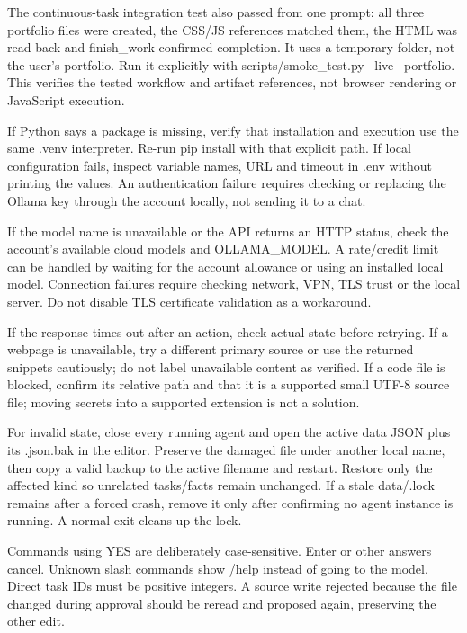 The continuous-task integration test also passed from one prompt: all three portfolio files were created, the CSS/JS references matched them, the HTML was read back and finish\_work confirmed completion. It uses a temporary folder, not the user's portfolio. Run it explicitly with scripts/smoke\_test.py --live --portfolio. This verifies the tested workflow and artifact references, not browser rendering or JavaScript execution.

If Python says a package is missing, verify that installation and execution use the same .venv interpreter. Re-run pip install with that explicit path. If local configuration fails, inspect variable names, URL and timeout in .env without printing the values. An authentication failure requires checking or replacing the Ollama key through the account locally, not sending it to a chat.

If the model name is unavailable or the API returns an HTTP status, check the account's available cloud models and OLLAMA\_MODEL. A rate/credit limit can be handled by waiting for the account allowance or using an installed local model. Connection failures require checking network, VPN, TLS trust or the local server. Do not disable TLS certificate validation as a workaround.

If the response times out after an action, check actual state before retrying. If a webpage is unavailable, try a different primary source or use the returned snippets cautiously; do not label unavailable content as verified. If a code file is blocked, confirm its relative path and that it is a supported small UTF-8 source file; moving secrets into a supported extension is not a solution.

For invalid state, close every running agent and open the active data JSON plus its .json.bak in the editor. Preserve the damaged file under another local name, then copy a valid backup to the active filename and restart. Restore only the affected kind so unrelated tasks/facts remain unchanged. If a stale data/.lock remains after a forced crash, remove it only after confirming no agent instance is running. A normal exit cleans up the lock.

Commands using YES are deliberately case-sensitive. Enter or other answers cancel. Unknown slash commands show /help instead of going to the model. Direct task IDs must be positive integers. A source write rejected because the file changed during approval should be reread and proposed again, preserving the other edit.

\cite{python-unittest}
